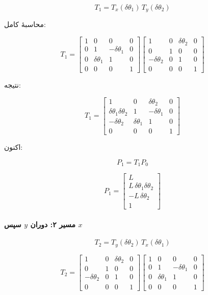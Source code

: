 \documentclass{article}
\begin{document}
\[
T_1 = T_x(\delta\theta_1)\,T_y(\delta\theta_2)
\]

محاسبهٔ کامل:

\[
T_1 =
\begin{bmatrix}
	1 & 0 & 0 & 0\\
	0 & 1 & -\delta\theta_1 & 0\\
	0 & \delta\theta_1 & 1 & 0\\
	0 & 0 & 0 & 1
\end{bmatrix}
\begin{bmatrix}
	1 & 0 & \delta\theta_2 & 0\\
	0 & 1 & 0 & 0\\
	-\delta\theta_2 & 0 & 1 & 0\\
	0 & 0 & 0 & 1
\end{bmatrix}
\]

نتیجه:

\[
T_1 =
\begin{bmatrix}
	1 & 0 & \delta\theta_2 & 0\\
	\delta\theta_1\delta\theta_2 & 1 & -\delta\theta_1 & 0\\
	-\delta\theta_2 & \delta\theta_1 & 1 & 0\\
	0 & 0 & 0 & 1
\end{bmatrix}
\]

اکنون:

\[
P_1 = T_1 P_0
\]

\[
P_1 =
\begin{bmatrix}
	L\\[4pt]
	L\,\delta\theta_1 \delta\theta_2\\[4pt]
	-L\,\delta\theta_2\\[4pt]
	1
\end{bmatrix}
\]


\paragraph{مسیر ۲: دوران $y$ سپس $x$}

\[
T_2 = T_y(\delta\theta_2)\,T_x(\delta\theta_1)
\]

\[
T_2 =
\begin{bmatrix}
	1 & 0 & \delta\theta_2 & 0\\
	0 & 1 & 0 & 0\\
	-\delta\theta_2 & 0 & 1 & 0\\
	0 & 0 & 0 & 1
\end{bmatrix}
\begin{bmatrix}
	1 & 0 & 0 & 0\\
	0 & 1 & -\delta\theta_1 & 0\\
	0 & \delta\theta_1 & 1 & 0\\
	0 & 0 & 0 & 1
\end{bmatrix}
\]
\end{document}
